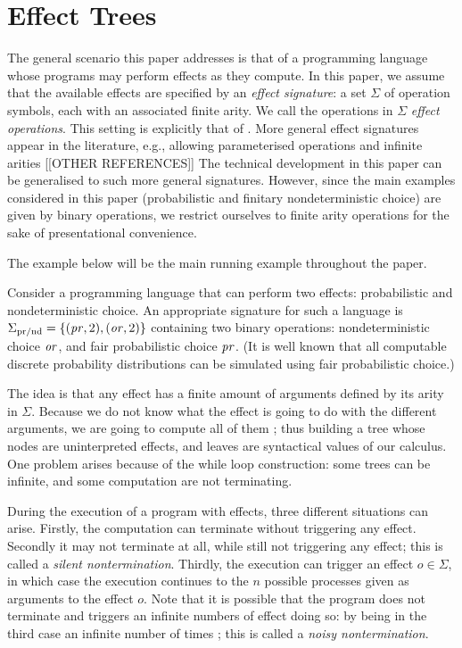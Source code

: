 \section{Effect Trees}
\label{section:trees}

The general scenario this paper addresses is that of a programming language whose programs may perform effects as they compute. In this paper, we assume that the available effects are  specified 
by  an \emph{effect signature}: a set $\Sigma$ of operation symbols, each with an associated finite arity. We call the operations in $\Sigma$ \emph{effect operations}. This setting is explicitly that of \cite{plotkin2001adequacy}.
More general effect signatures appear in the literature, e.g., allowing parameterised operations and infinite arities
\cite{gom} [[OTHER REFERENCES]] The technical development in this paper can be generalised to such
more general signatures. However, since the main examples considered in this paper (probabilistic and finitary nondeterministic choice) are given by binary operations, we restrict ourselves to finite arity operations 
for the sake of presentational convenience.

The example below will be the main running example throughout the paper.
\begin{example}
\label{example:prnd}
    Consider a programming language that can perform two effects: probabilistic and nondeterministic choice.
    An appropriate signature for such a language is 
    $\Sigma_{\text{pr/nd}} = \{ (\operatorname{\mathit{pr}},2), (\operatorname{\mathit{or}},2) \}$ containing two binary operations:
    nondeterministic choice $\operatorname{\mathit{or}}$, 
    and fair probabilistic choice $\operatorname{\mathit{pr}}$. (It is well known that all computable discrete probability distributions can be 
     simulated using fair probabilistic choice.)
 \end{example}

The idea is that any effect has a finite amount of arguments defined 
by its arity in $\Sigma$. Because we do not know what the effect is going 
to do with the different arguments, we are going to compute all of them ;  
thus building a tree whose nodes are uninterpreted effects, and leaves are 
syntactical values of our calculus. One problem arises because of 
the while loop construction: some trees can be infinite, and some computation 
are not terminating. 

During the execution of a program with effects, three different situations can arise.
Firstly, the computation can terminate without triggering any effect. Secondly
it may not terminate at all, while still not triggering any effect; this is
called a \emph{silent nontermination}. Thirdly,
the execution can trigger an effect $o \in \Sigma$, in which case the execution continues 
to the $n$ possible processes given as arguments to the effect $o$.
Note that it is possible that the program does not terminate and triggers an
infinite numbers of effect doing so: by being in the third case an infinite
number of times ; this is called a \emph{noisy nontermination}.


